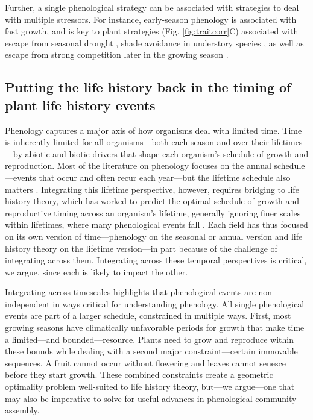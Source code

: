 \documentclass[11pt]{article}
\begin{document}
Further, a single phenological strategy can be associated with strategies to deal with multiple stressors.  For instance, early-season phenology is associated with fast growth, and is key to plant strategies (Fig. \ref{fig:traitcorr}C) associated with escape from seasonal drought \citep{blumenthal2020traits}, shade avoidance in understory species \citep{augspurger2005light}, as well as escape from strong competition later in the growing season \citep{gioria2014resource, godoy2014}.

\subsection*{Putting the life history back in the timing of plant life history events} 

Phenology captures a major axis of how organisms deal with limited time. Time is inherently limited for all organisms---both each season and over their lifetimes---by abiotic and biotic drivers that shape each organism's schedule of growth and reproduction. Most of the literature on phenology focuses on the annual schedule---events that occur and often recur each year---but the lifetime schedule also matters \citep{post2008phenological,park2022seasonal}. Integrating this lifetime perspective, however, requires bridging to life history theory, which has worked to predict the optimal schedule of growth and reproductive timing across an organism's lifetime, generally ignoring finer scales within lifetimes, where many phenological events fall \citep[but see][]{bazzaz1987allocating,ejsmond2010time}. Each field has thus focused on its own version of time---phenology on the seasonal or annual version and life history theory on the lifetime version---in part because of the challenge of integrating across them. Integrating across these temporal perspectives is critical, we argue, since each is likely to impact the other. 

Integrating across timescales highlights that phenological events are non-independent in ways critical for understanding phenology. All single phenological events are part of a larger schedule, constrained in multiple ways. First, most growing seasons have climatically unfavorable periods for growth that make time a limited---and bounded---resource. Plants need to grow and reproduce within these bounds while dealing with a second major constraint---certain immovable sequences. A fruit cannot occur without flowering and leaves cannot senesce before they start growth. These combined constraints create a geometric optimality problem well-suited to life history theory, but---we argue---one that may also be imperative to solve for useful advances in phenological community assembly.
\end{document}
